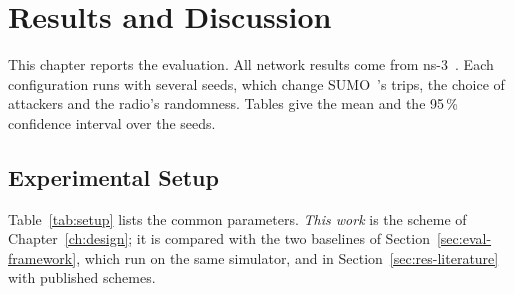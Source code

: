 \chapter{Results and Discussion}\label{ch:results}

This chapter reports the evaluation. All network results come from ns-3~\cite{riley2010ns3}. Each configuration runs with
several seeds, which change SUMO~\cite{lopez2018sumo}'s trips, the choice of attackers and the radio's randomness. Tables
give the mean and the 95\,\% confidence interval over the seeds.

\section{Experimental Setup}

\begin{table}[htbp]\centering\small
\caption{Common parameters of the network experiments}\label{tab:setup}
\end{table}

Table~\ref{tab:setup} lists the common parameters. \emph{This work} is the scheme of
Chapter~\ref{ch:design}; it is compared with the two baselines of
Section~\ref{sec:eval-framework}, which run on the same simulator, and in
Section~\ref{sec:res-literature} with published schemes.

